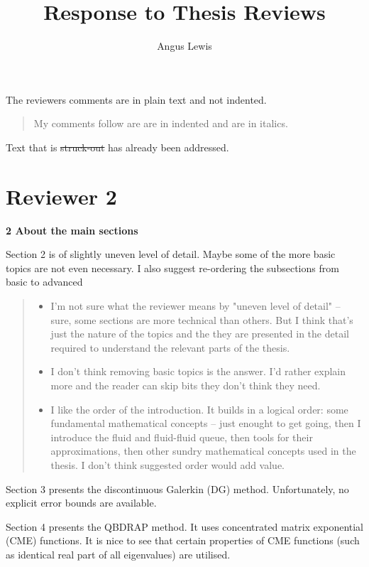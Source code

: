 \documentclass[a4paper]{article}
\title{Response to Thesis Reviews}
\author{Angus Lewis}
\begin{document}
\maketitle
The reviewers comments are in plain text and not indented. 
\begin{quote}
    My comments follow are are in indented and are in italics. 
\end{quote}
Text that is \st{struck-out} has already been addressed.

\section{Reviewer 2}

\textbf{2 About the main sections}

Section 2 is of slightly uneven level of detail. Maybe some of the more basic topics are not even necessary. I also suggest re-ordering the subsections from basic to advanced
\begin{quote}
    \begin{itemize}
        \item I'm not sure what the reviewer means by "uneven level of detail" -- sure, some sections are more technical than others. But I think that's just the nature of the topics and the they are presented in the detail required to understand the relevant parts of the thesis. 

        \item I don't think removing basic topics is the answer. I'd rather explain more and the reader can skip bits they don't think they need. 

        \item I like the order of the introduction. It builds in a logical order: some fundamental mathematical concepts -- just enought to get going, then I introduce the fluid and fluid-fluid queue, then tools for their approximations, then other sundry mathematical concepts used in the thesis. I don't think suggested order would add value.  
    \end{itemize}
\end{quote}

Section 3 presents the discontinuous Galerkin (DG) method. Unfortunately, no explicit error bounds are available.

Section 4 presents the QBDRAP method. It uses concentrated matrix exponential (CME) functions. It is nice to see that certain properties of CME functions (such as identical real part of all eigenvalues) are utilised. 
\end{document}
